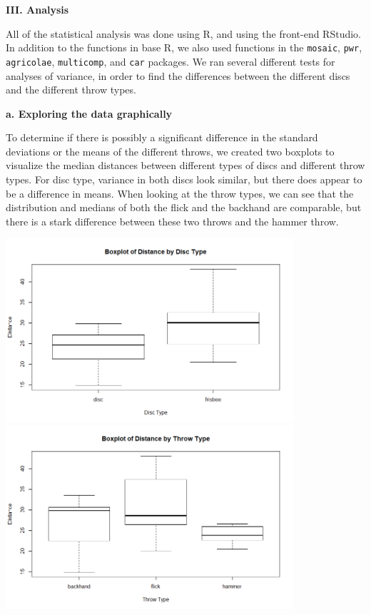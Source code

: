 \documentclass[letter,12pt]{article}
\begin{document}
	\begin{center}
		\textbf{III. Analysis}\par
	\end{center}
	\justify
	All of the statistical analysis was done using R, and using the front-end RStudio. In addition to the functions in base R, we also used functions in the \verb|mosaic|, \verb|pwr|, \verb|agricolae|, \verb|multicomp|, and \verb|car| packages. We ran several different tests for analyses of variance, in order to find the differences between the different discs and the different throw types.\par
	
	\begin{center}
		\textbf{a. Exploring the data graphically}\par
	\end{center}
	\justify
	To determine if there is possibly a significant difference in the standard deviations or the means of the different throws, we created two boxplots to visualize the median distances between different types of discs and different throw types. For disc type, variance in both discs look similar, but there does appear to be a difference in means. When looking at the throw types, we can see that the distribution and medians of both the flick and the backhand are comparable, but there is a stark difference between these two throws and the hammer throw.\par
  \begin{center}
    \includegraphics[width=0.8\textwidth]{boxplotdistdisc.png}
    \includegraphics[width=0.8\textwidth]{boxplotdiststhrow.png}
  \end{center}
\end{document}
